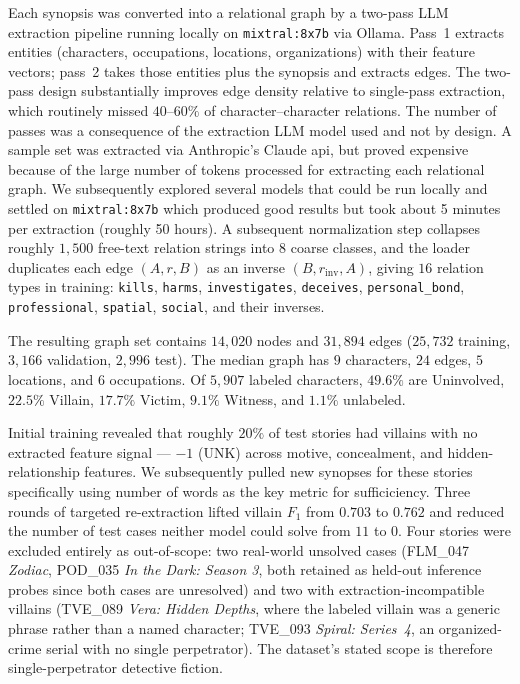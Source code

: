 \documentclass[11pt]{article}
\theoremstyle{definition}
\begin{document}
Each synopsis was converted into a relational graph by a two-pass LLM extraction pipeline running locally on \texttt{mixtral:8x7b} via Ollama. Pass~1 extracts entities (characters, occupations, locations, organizations) with their feature vectors; pass~2 takes those entities plus the synopsis and extracts edges. The two-pass design substantially improves edge density relative to single-pass extraction, which routinely missed $40$--$60\%$ of character--character relations. The number of passes was a consequence of the extraction LLM model used and not by design. A sample set was extracted via Anthropic's Claude api, but proved expensive because of the large number of tokens processed for extracting each relational graph. We subsequently explored several models that could be run locally and settled on \texttt{mixtral:8x7b} which produced good results but took about 5 minutes per extraction (roughly 50 hours).    A subsequent normalization step collapses roughly $1{,}500$ free-text relation strings into $8$ coarse classes, and the loader duplicates each edge $(A, r, B)$ as an inverse $(B, r_{\text{inv}}, A)$, giving $16$ relation types in training: \texttt{kills}, \texttt{harms}, \texttt{investigates}, \texttt{deceives}, \texttt{personal\_bond}, \texttt{professional}, \texttt{spatial}, \texttt{social}, and their inverses.

The resulting graph set contains $14{,}020$ nodes and $31{,}894$ edges ($25{,}732$ training, $3{,}166$ validation, $2{,}996$ test). The median graph has $9$ characters, $24$ edges, $5$ locations, and $6$ occupations. Of $5{,}907$ labeled characters, $49.6\%$ are Uninvolved, $22.5\%$ Villain, $17.7\%$ Victim, $9.1\%$ Witness, and $1.1\%$ unlabeled.

Initial training revealed that roughly $20\%$ of test stories had villains with no extracted feature signal --- $-1$ (UNK) across motive, concealment, and hidden-relationship features. We subsequently pulled new synopses for these stories specifically using number of words as the key metric for sufficiciency. Three rounds of targeted re-extraction lifted villain $F_1$ from $0.703$ to $0.762$ and reduced the number of test cases neither model could solve from $11$ to $0$. Four stories were excluded entirely as out-of-scope: two real-world unsolved cases (FLM\_047 \emph{Zodiac}, POD\_035 \emph{In the Dark: Season 3}, both retained as held-out inference probes since both cases are unresolved) and two with extraction-incompatible villains (TVE\_089 \emph{Vera: Hidden Depths}, where the labeled villain was a generic phrase rather than a named character; TVE\_093 \emph{Spiral: Series~4}, an organized-crime serial with no single perpetrator). The dataset's stated scope is therefore single-perpetrator detective fiction.
\end{document}
